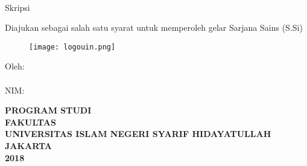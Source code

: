 \begin{center}
    {\textbf{\Large \judul}}\\
    \vspace{2cm}
    {\large Skripsi}

    Diajukan sebagai salah satu syarat untuk memperoleh gelar Sarjana Sains (S.Si)

    \begin{figure}[H]
        \centering
        \vspace{1cm}
        \texttt{[image: logouin.png]}\label{fig:logouin}\\
        \vspace{2cm}
    \end{figure}

    Oleh:\\
    \textbf{\penulis}\\
    NIM:\ \nim\\
    \vfill

    {%
    \bfseries 
        PROGRAM STUDI \MakeUppercase{\jurusan}\\
        FAKULTAS \MakeUppercase{\fakultas}\\
        UNIVERSITAS ISLAM NEGERI SYARIF HIDAYATULLAH\\
        JAKARTA\\
        2018\\
    }
\end{center}
